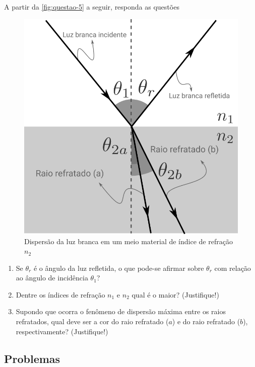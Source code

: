\begin{quest}
    A partir da \autoref{fig:questao-5} a seguir, responda as questões
    \vspace*{30pt}
    \begin{figure}[ht!]
        \centering
        \includegraphics[width=.6\textwidth]{img/questao-5.png}
        \caption{Dispersão da luz branca em um meio material de índice de refração $n_2$}
        \label{fig:questao-5}  
    \end{figure}
    \vspace*{20pt}
    \begin{enumerate}[label=\alph *)]
        \item Se $\theta_r$ é o ângulo da luz refletida, o que pode-se afirmar sobre $\theta_r$ com relação ao ângulo de incidência $\theta_1$?
        \item Dentre os índices de refração $n_1$ e $n_2$ qual é o maior? (Justifique!)
        \item Supondo que ocorra o fenômeno de dispersão máxima entre os raios refratados, qual deve ser a cor do raio refratado ($a$) e do raio refratado ($b$), respectivamente? (Justifique!)
    \end{enumerate}        
\end{quest}

\subsection{Problemas}

